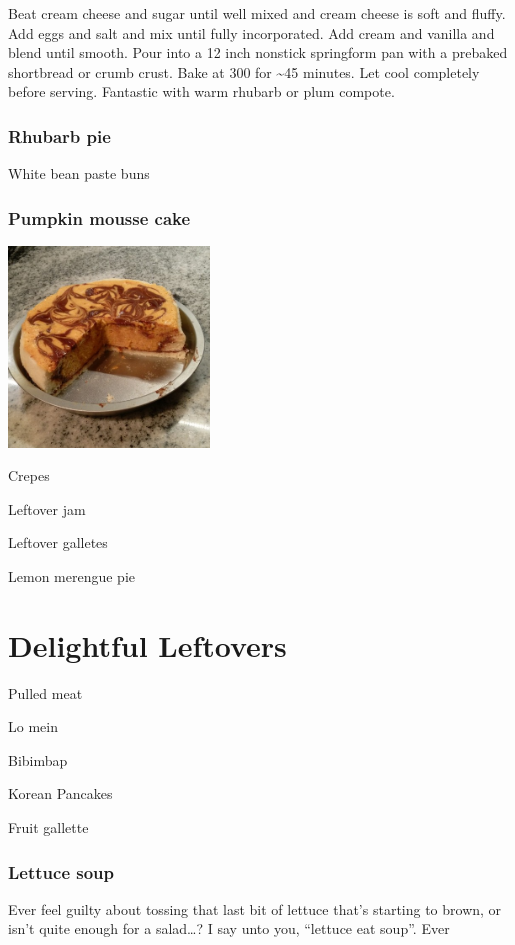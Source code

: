 \documentclass[
]{book}
\begin{document}
Beat cream cheese and sugar until well mixed and cream cheese is soft and fluffy. Add eggs and salt and mix until fully incorporated. Add cream and vanilla and blend until smooth. Pour into a 12 inch nonstick springform pan with a prebaked shortbread or crumb crust. Bake at 300 for \textasciitilde45 minutes. Let cool completely before serving. Fantastic with warm rhubarb or plum compote.

\hypertarget{rhubarb-pie}{%
\subsection*{Rhubarb pie}\label{rhubarb-pie}}

White bean paste buns

\hypertarget{pumpkincake}{%
\subsection*{Pumpkin mousse cake}\label{pumpkincake}}

\includegraphics[width=0.4\textwidth,height=\textheight]{pumpkin_mousse_cake_small.jpg}

Crepes

Leftover jam

Leftover galletes

Lemon merengue pie

\hypertarget{delightful-leftovers}{%
\chapter*{Delightful Leftovers}\label{delightful-leftovers}}

Pulled meat

Lo mein

Bibimbap

Korean Pancakes

Fruit gallette

\hypertarget{lettuce-soup}{%
\subsection*{Lettuce soup}\label{lettuce-soup}}

Ever feel guilty about tossing that last bit of lettuce that's starting to brown, or isn't quite enough for a salad\ldots? I say unto you, ``lettuce eat soup''.
Ever

  
\end{document}

